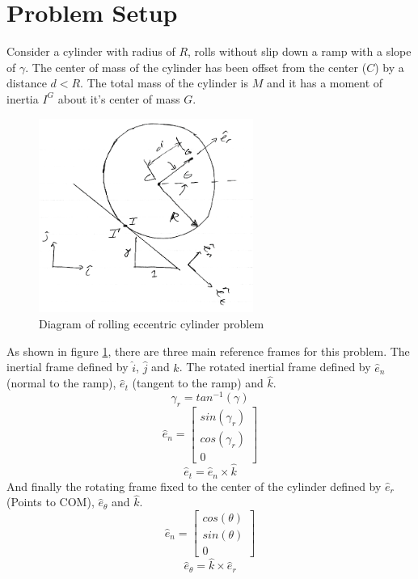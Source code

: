 \documentclass[12pt]{article}
\let\Oldsection\section
\renewcommand{\section}{\FloatBarrier\Oldsection}
\begin{document}
\section{Problem Setup}
Consider a cylinder with radius of $R$, rolls without slip down a ramp with a slope of $\gamma$.
The center of mass of the cylinder has been offset from the center ($C$) by a distance $d < R$.
The total mass of the cylinder is $M$ and it has a moment of inertia $I^G$ about it's center of mass $G$.

\begin{figure}[h]
\centering
\includegraphics[height=2.5in]{img/problem_def.png}
\caption{Diagram of rolling eccentric cylinder problem}
\label{fig:problem_def}
\end{figure}

As shown in figure \ref{fig:problem_def}, there are three main reference frames for this problem.
The inertial frame defined by $\hat{i}$, $\hat{j}$ and $\hat{k}$.
The rotated inertial frame defined by $\hat{e}_n$ (normal to the ramp), $\hat{e}_t$ (tangent to the ramp) and $\hat{k}$.
\begin{equation}
\gamma_r = tan^{-1}(\gamma)
\end{equation}
\begin{equation}
\hat{e}_n =	\begin{bmatrix} sin(\gamma_r) \\ cos(\gamma_r) \\0 \end{bmatrix}
\end{equation}
\begin{equation}
\hat{e}_t =	\hat{e}_n \times \hat{k}
\end{equation}
And finally the rotating frame fixed to the center of the cylinder defined by $\hat{e}_r$ (Points to COM), $\hat{e}_\theta$ and $\hat{k}$.
\begin{equation}
\hat{e}_n =	\begin{bmatrix} cos(\theta) \\ sin(\theta) \\0 \end{bmatrix}
\end{equation}
\begin{equation}
\hat{e}_{\theta} =	\hat{k} \times \hat{e}_r
\end{equation}
\end{document}
